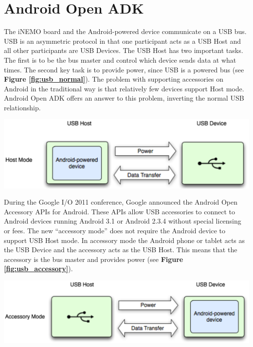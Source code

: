 \section{Android Open ADK}
\label{adk_sec}

The iNEMO board and the Android-powered device communicate on a USB bus. USB is an asymmetric protocol in that one participant acts as a USB Host and all other participants are USB Devices. The USB Host has two important tasks. The first is to be the bus master and control which device sends data at what times. The second key task is to provide power, since USB is a powered bus (see {\bf Figure \ref{fig:usb_normal}}). The problem with supporting accessories on Android in the traditional way is that relatively few devices support Host mode. Android Open ADK offers an answer to this problem, inverting the normal USB relationship.

\begin{center}
	\includegraphics[width=1\linewidth]{pics/usb_normal.eps}
	\label{fig:usb_normal}
\end{center}

During the Google I/O 2011 conference, Google announced the Android Open Accessory APIs for Android. These APIs allow USB accessories to connect to Android devices running Android 3.1 or Android 2.3.4 without special licensing or fees. The new ``accessory mode'' does not require the Android device to support USB Host mode. In accessory mode the Android phone or tablet acts as the USB Device and the accessory acts as the USB Host. This means that the accessory is the bus master and provides power (see {\bf Figure \ref{fig:usb_accessory}}).

\begin{center}
	\includegraphics[width=1\linewidth]{pics/usb_accessory.eps}
	\label{fig:usb_accessory}
\end{center}

